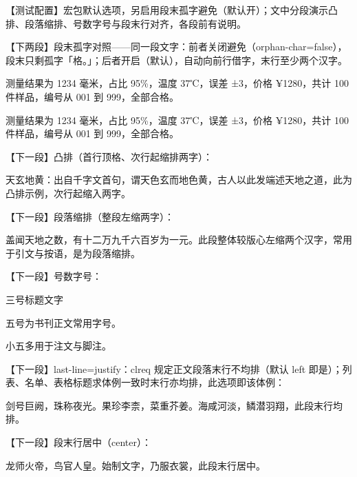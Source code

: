 \documentclass[12pt]{article}
\begin{document}
{\small 【测试配置】宏包默认选项，另启用段末孤字避免（默认开）；文中分段演示凸排、段落缩排、号数字号与段末行对齐，各段前有说明。}

{\small 【下两段】段末孤字对照——同一段文字：前者关闭避免（orphan-char=false），段末只剩孤字「格。」；后者开启（默认），自动向前行借字，末行至少两个汉字。}

测量结果为 1234 毫米，占比 95\%，温度 37℃，误差 ±3，价格 ¥1280，共计 100 件样品，编号从 001 到 999，全部合格。

测量结果为 1234 毫米，占比 95\%，温度 37℃，误差 ±3，价格 ¥1280，共计 100 件样品，编号从 001 到 999，全部合格。

{\small 【下一段】凸排（首行顶格、次行起缩排两字）：}

\begin{凸排}
天玄地黄：出自千字文首句，谓天色玄而地色黄，古人以此发端述天地之道，此为凸排示例，次行起缩入两字。
\end{凸排}

{\small 【下一段】段落缩排（整段左缩两字）：}

\begin{段落缩排}
盖闻天地之数，有十二万九千六百岁为一元。此段整体较版心左缩两个汉字，常用于引文与按语，是为段落缩排。
\end{段落缩排}

{\small 【下一段】号数字号：}

{ 三号标题文字\par}

{ 五号为书刊正文常用字号。\par}

{ 小五多用于注文与脚注。\par}

{\small 【下一段】last-line=justify：clreq 规定正文段落末行不均排（默认 left 即是）；列表、名单、表格标题求体例一致时末行亦均排，此选项即该体例：}

剑号巨阙，珠称夜光。果珍李柰，菜重芥姜。海咸河淡，鳞潜羽翔，此段末行均排。

{\small 【下一段】段末行居中（center）：}

龙师火帝，鸟官人皇。始制文字，乃服衣裳，此段末行居中。

\end{document}
